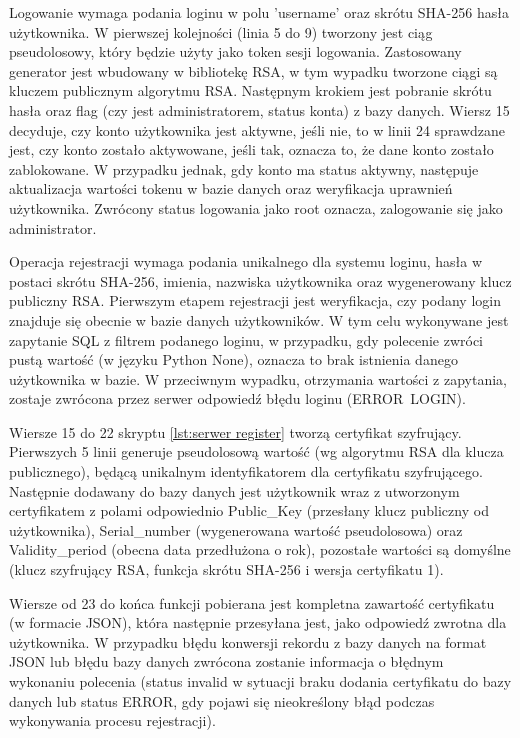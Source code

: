 	Logowanie wymaga podania loginu w polu 'username' oraz skrótu SHA-256 hasła użytkownika. W pierwszej kolejności (linia 5 do 9) tworzony jest ciąg pseudolosowy, który będzie użyty jako token sesji logowania. Zastosowany generator jest wbudowany w bibliotekę RSA, w tym wypadku tworzone ciągi są kluczem publicznym algorytmu RSA. Następnym krokiem jest pobranie skrótu hasła oraz flag (czy jest administratorem, status konta) z bazy danych. Wiersz 15 decyduje, czy konto użytkownika jest aktywne, jeśli nie, to w linii 24 sprawdzane jest, czy konto zostało aktywowane, jeśli tak, oznacza to, że dane konto zostało zablokowane. W przypadku jednak, gdy konto ma status aktywny, następuje aktualizacja wartości tokenu w bazie danych oraz weryfikacja uprawnień użytkownika. Zwrócony status logowania jako root oznacza, zalogowanie się jako administrator.
	
	Operacja rejestracji wymaga podania unikalnego dla systemu loginu, hasła w postaci skrótu SHA-256, imienia, nazwiska użytkownika oraz wygenerowany klucz publiczny RSA. Pierwszym etapem rejestracji jest weryfikacja, czy podany login znajduje się obecnie w bazie danych użytkowników. W tym celu wykonywane jest zapytanie SQL z filtrem podanego loginu, w przypadku, gdy polecenie zwróci pustą wartość (w języku Python None), oznacza to brak istnienia danego użytkownika w bazie. W przeciwnym wypadku, otrzymania wartości z zapytania, zostaje zwrócona przez serwer odpowiedź błędu loginu (ERROR~LOGIN).
	
	Wiersze 15 do 22 skryptu \ref{lst:serwer register} tworzą certyfikat szyfrujący. Pierwszych 5 linii generuje pseudolosową wartość (wg algorytmu RSA dla klucza publicznego), będącą unikalnym identyfikatorem dla certyfikatu szyfrującego. Następnie dodawany do bazy danych jest użytkownik wraz z utworzonym certyfikatem z polami odpowiednio Public\_Key (przesłany klucz publiczny od użytkownika), Serial\_number (wygenerowana wartość pseudolosowa) oraz Validity\_period (obecna data przedłużona o rok), pozostałe wartości są domyślne (klucz szyfrujący RSA, funkcja skrótu SHA-256 i wersja certyfikatu 1).

	Wiersze od 23 do końca funkcji pobierana jest kompletna zawartość certyfikatu (w formacie JSON), która następnie przesyłana jest, jako odpowiedź zwrotna dla użytkownika. W przypadku błędu konwersji rekordu z bazy danych na format JSON lub błędu bazy danych zwrócona zostanie informacja o błędnym wykonaniu polecenia (status invalid w sytuacji braku dodania certyfikatu do bazy danych lub status ERROR, gdy pojawi się nieokreślony błąd podczas wykonywania procesu rejestracji).
	\newpage


